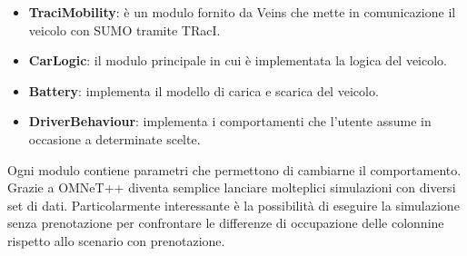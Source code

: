 \begin{itemize}
	\item \textbf{TraciMobility}: è un modulo fornito da Veins che mette in comunicazione il veicolo con SUMO tramite TRacI.
	\item \textbf{CarLogic}: il modulo principale in cui è implementata la logica del veicolo. 
	\item \textbf{Battery}: implementa il modello di carica e scarica del veicolo.
	\item \textbf{DriverBehaviour}: implementa i comportamenti che l'utente assume in occasione a determinate scelte.  
\end{itemize}

Ogni modulo contiene parametri che permettono di cambiarne il comportamento. Grazie a OMNeT++ diventa semplice lanciare molteplici simulazioni con diversi set di dati. Particolarmente interessante è la possibilità di eseguire la simulazione senza prenotazione per confrontare le differenze di occupazione delle colonnine rispetto allo scenario con prenotazione.

